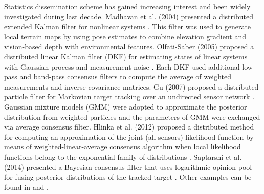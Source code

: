 	Statistics dissemination scheme has gained increasing interest and been widely investigated during last decade.
	Madhavan et al. (2004) presented a distributed extended Kalman filter for nonlinear systems \cite{madhavan2004distributed}. This filter was used to generate local terrain maps by using pose estimates to combine elevation gradient and vision-based depth with environmental features. Olfati-Saber (2005) proposed a distributed linear Kalman filter (DKF) for estimating states of linear systems with Gaussian process and measurement noise \cite{2005distributed}. Each DKF used additional low-pass and band-pass consensus filters to compute the average of weighted measurements and inverse-covariance matrices. 
	Gu (2007) proposed a distributed particle filter for Markovian target tracking over an undirected sensor network \cite{gu2007distributed}. Gaussian mixture models (GMM) were adopted to approximate the posterior distribution from weighted particles and the parameters of GMM were exchanged via average consensus filter. 
	Hlinka et al. (2012) proposed a distributed method for computing an approximation of the joint (all-sensors) likelihood function by means of weighted-linear-average consensus algorithm when local likelihood functions belong to the exponential family of distributions \cite{hlinka2012likelihood}. Saptarshi et al. (2014) presented a Bayesian consensus filter that uses logarithmic opinion pool for fusing posterior distributions of the tracked target \cite{bandyopadhyay2014distributed}. Other examples can be found in \cite{julian2012distributed} and \cite{beaudeau2012target}. 
	
